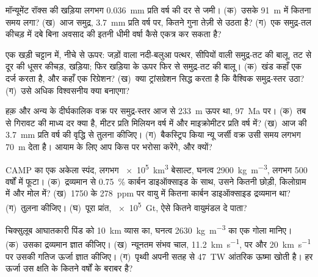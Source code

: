 \begin{exercise}[$\star$]\label{exo:b2:phanerozoic-earth:3}
मॉन्यूमेंट रॉक्स की खड़िया लगभग \qty{0.036}{mm} प्रति वर्ष की दर से जमी। (क)~उसके
\qty{91}{m} में कितना समय लगा? (ख)~आज समुद्र, \qty{3.7}{mm} प्रति
वर्ष पर, कितने गुना तेज़ी से उठता है? (ग)~एक समुद्र-तल कीचड़ में दबे बिना अवसाद की इतनी धीमी वर्षा कैसे एकत्र कर सकता है?
\end{exercise}

\begin{exercise}[$\star$]\label{exo:b2:phanerozoic-earth:4}
एक खड़ी चट्टान में, नीचे से ऊपर: जड़ों वाला नदी-बलुआ पत्थर, सीपियों वाली समुद्र-तट की बालू, तट से दूर की धूसर
कीचड़, खड़िया; फिर खड़िया के ऊपर फिर से समुद्र-तट की बालू। (क)~खंड कहाँ एक
 दर्ज करता है, और कहाँ एक रिग्रेशन? (ख)~क्या ट्रांसग्रेशन सिद्ध करता है कि वैश्विक
समुद्र-स्तर उठा? (ग)~उसे अधिक विश्वसनीय क्या बनाएगा?
\end{exercise}

\begin{exercise}[$\star\star$]\label{exo:b2:phanerozoic-earth:5}
हक़ और अन्य के दीर्घकालिक वक्र पर समुद्र-स्तर आज से \qty{233}{m} ऊपर था,
\qty{97}{Ma} पर। (क)~तब से गिरावट की माध्य दर क्या है, मीटर प्रति मिलियन वर्ष में और
माइक्रोमीटर प्रति वर्ष में? (ख)~आज की \qty{3.7}{mm} प्रति वर्ष की वृद्धि से तुलना कीजिए। (ग)~बैकस्ट्रिप किया
न्यू जर्सी वक्र उसी समय लगभग \qty{70}{m} देता है। आयाम के लिए आप किस पर भरोसा करेंगे,
और क्यों?
\end{exercise}

\begin{exercise}[$\star\star$]\label{exo:b2:phanerozoic-earth:6}
CAMP का एक अकेला स्पंद, लगभग \qty{e5}{km^3} बेसाल्ट, घनत्व \qty{2900}{kg.m^{-3}},
लगभग 500 वर्षों में फूटा। (क)~द्रव्यमान से \qty{0.75}{\percent} कार्बन डाइऑक्साइड के साथ, उसने कितनी
छोड़ी, किलोग्राम में और मोल में? (ख)~1750 के \qty{278}{ppm} पर वायु में कितना
कार्बन डाइऑक्साइड द्रव्यमान था? (ग)~तुलना कीजिए। (घ)~पूरा प्रांत,
\qty{e5}{Gt}, ऐसे कितने वायुमंडल दे पाता?
\end{exercise}

\begin{exercise}[$\star\star$]\label{exo:b2:phanerozoic-earth:7}
चिक्सुलूब आघातकारी पिंड को \qty{10}{km} व्यास का, घनत्व
\qty{2630}{kg.m^{-3}} का एक गोला मानिए। (क)~उसका द्रव्यमान ज्ञात कीजिए। (ख)~न्यूनतम संभव
चाल, \qty{11.2}{km.s^{-1}}, पर और \qty{20}{km.s^{-1}} पर उसकी गतिज ऊर्जा ज्ञात कीजिए। (ग)~पृथ्वी अपनी सतह से
\qty{47}{TW} आंतरिक ऊष्मा खोती है। हर ऊर्जा उस क्षति के कितने वर्षों के बराबर है?
\end{exercise}

